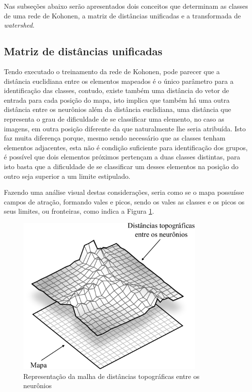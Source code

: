 Nas subseções abaixo serão apresentados dois conceitos que determinam as classes
de uma rede de Kohonen, a matriz de distâncias unificadas e a transformada de
\textit{watershed}.

\subsection{Matriz de distâncias unificadas}\label{sec:u_matriz}

Tendo executado o treinamento da rede de Kohonen, pode parecer que a distância
euclidiana entre os elementos mapeados é o único parâmetro para a identificação
das classes, contudo, existe também uma distância do vetor de entrada para cada
posição do mapa, isto implica que também há uma outra distância entre os
neurônios além da distância euclidiana, uma distância que representa o grau de
dificuldade de se classificar uma elemento, no caso as imagens, em outra posição
diferente da que naturalmente lhe seria atribuída. Isto faz muita diferença
porque, mesmo sendo necessário que as classes tenham elementos adjacentes, esta
não é condição suficiente para identificação dos grupos, é possível que
dois elementos próximos pertençam a duas classes distintas, para isto basta
que a dificuldade de se classificar um desses elementos na posição do outro seja
superior a um limite estipulado.

Fazendo uma análise visual destas considerações, seria como se o mapa possuísse
campos de atração, formando vales e picos, sendo os vales as classes e os picos
os seus limites, ou fronteiras, como indica a Figura \ref{fig:mapa_x_umatriz}.

\begin{figure}[H]
  \begin{center}
    \includegraphics[height=8cm]{imagens/mapa_x_umatriz.pdf}
  \end{center}
  \caption{ Representação da malha de distâncias topográficas entre os neurônios }
  \label{fig:mapa_x_umatriz}
\end{figure}

